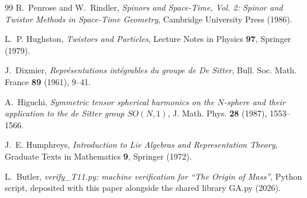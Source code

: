 \documentclass[11pt]{article}
\theoremstyle{definition}
\begin{document}
\begin{thebibliography}{99}
R.~Penrose and W.~Rindler,
\emph{Spinors and Space-Time, Vol. 2: Spinor and Twistor Methods in Space-Time Geometry},
Cambridge University Press (1986).

L.~P. Hughston,
\emph{Twistors and Particles},
Lecture Notes in Physics \textbf{97}, Springer (1979).

J.~Dixmier,
\emph{Repr\'esentations int\'egrables du groupe de De Sitter},
Bull. Soc. Math. France \textbf{89} (1961), 9--41.

A.~Higuchi,
\emph{Symmetric tensor spherical harmonics on the $N$-sphere and their application to the de Sitter group $SO(N,1)$},
J. Math. Phys. \textbf{28} (1987), 1553--1566.

J.~E. Humphreys,
\emph{Introduction to Lie Algebras and Representation Theory},
Graduate Texts in Mathematics \textbf{9}, Springer (1972).

L.~Butler,
\emph{verify\_T11.py: machine verification for ``The Origin of Mass''},
Python script, deposited with this paper alongside the shared library GA.py (2026).

\end{thebibliography}
\end{document}
